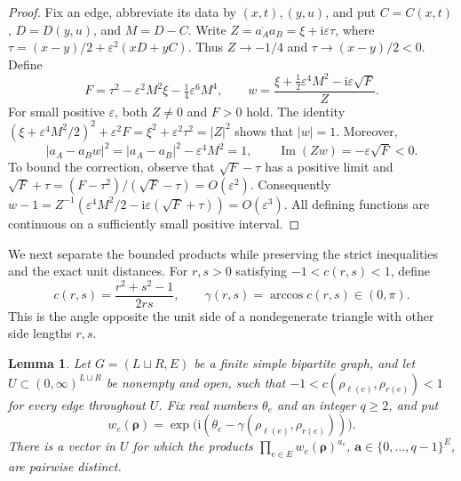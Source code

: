 \documentclass[a4paper,11pt]{amsart}
\newtheorem{lemma}[theorem]{Lemma}
\theoremstyle{remark}
\newcommand{\ii}{\mathrm i}
\begin{document}
\begin{proof}
Fix an edge, abbreviate its data by $(x,t),(y,u)$, and put
$C=C(x,t)$, $D=D(y,u)$, and $M=D-C$.
Write
$Z=\overline{a_A}a_B=\xi+\ii\varepsilon\tau$, where
$\tau=(x-y)/2+\varepsilon^2(xD+yC)$.
Thus $Z\to-1/4$ and $\tau\to(x-y)/2<0$.
Define
\begin{equation}\label{eq:exact-w}
 F=\tau^2-\varepsilon^2M^2\xi-\tfrac14\varepsilon^6M^4,
 \qquad
 w=\frac{\xi+\tfrac12\varepsilon^4M^2-
                  \ii\varepsilon\sqrt F}{Z}.
\end{equation}
For small positive $\varepsilon$, both $Z\ne0$ and $F>0$ hold.
The identity
$(\xi+\varepsilon^4M^2/2)^2+\varepsilon^2F
 =\xi^2+\varepsilon^2\tau^2=|Z|^2$
shows that $|w|=1$. Moreover,
\[
 |a_A-a_Bw|^2
 =|a_A-a_B|^2-\varepsilon^4M^2=1,\qquad
 \operatorname{Im}(Zw)=-\varepsilon\sqrt F<0.
\]
To bound the correction, observe that $\sqrt F-\tau$ has a positive
limit and
$\sqrt F+\tau=(F-\tau^2)/(\sqrt F-\tau)=O(\varepsilon^2)$.
Consequently
$w-1=Z^{-1}(\varepsilon^4M^2/2-
\ii\varepsilon(\sqrt F+\tau))=O(\varepsilon^3)$.
All defining functions are continuous on a sufficiently small positive
interval.
\end{proof}

We next separate the bounded products while preserving the strict
inequalities and the exact unit distances.
For $r,s>0$ satisfying $-1<c(r,s)<1$, define
\begin{equation}\label{eq:angle}
 c(r,s)=\frac{r^2+s^2-1}{2rs},\qquad
 \gamma(r,s)=\arccos c(r,s)\in(0,\pi).
\end{equation}
This is the angle opposite the unit side of a nondegenerate triangle
with other side lengths $r,s$.

\begin{lemma}\label{lem:separation}
Let $G=(L\sqcup R,E)$ be a finite simple bipartite graph, and let
$U\subset(0,\infty)^{L\sqcup R}$ be nonempty and open, such that
$-1<c(\rho_{\ell(e)},\rho_{r(e)})<1$ for every edge throughout $U$.
Fix real numbers $\theta_e$ and an integer $q\ge2$, and put
\[
 w_e(\boldsymbol\rho)
 =\exp\bigl(\ii(\theta_e-
       \gamma(\rho_{\ell(e)},\rho_{r(e)}))\bigr).
\]
There is a vector in $U$ for which the products
$\prod_{e\in E}w_e(\boldsymbol\rho)^{a_e}$,
$\mathbf a\in\{0,\ldots,q-1\}^{E}$, are pairwise distinct.
\end{lemma}
\end{document}
